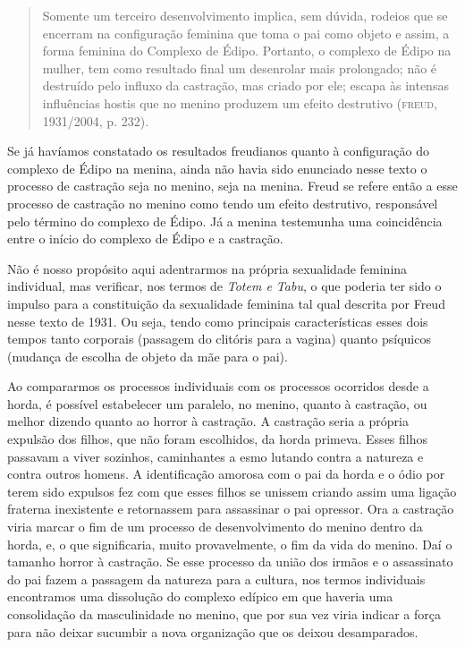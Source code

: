 \begin{quote}
Somente um terceiro desenvolvimento implica, sem dúvida, rodeios que se
encerram na configuração feminina que toma o pai como objeto e assim, a
forma feminina do Complexo de Édipo. Portanto, o complexo de Édipo na
mulher, tem como resultado final um desenrolar mais prolongado; não é
destruído pelo influxo da castração, mas criado por ele; escapa às
intensas influências hostis que no menino produzem um efeito destrutivo
(\textsc{freud}, 1931/2004, p. 232).
\end{quote}

Se já havíamos constatado os resultados freudianos quanto à configuração
do complexo de Édipo na menina, ainda não havia sido enunciado nesse
texto o processo de castração seja no menino, seja na menina. Freud se
refere então a esse processo de castração no menino como tendo um efeito
destrutivo, responsável pelo término do complexo de Édipo. Já a menina
testemunha uma coincidência entre o início do complexo de Édipo e a
castração.

Não é nosso propósito aqui adentrarmos na própria sexualidade feminina
individual, mas verificar, nos termos de \emph{Totem e Tabu}, o que poderia ter
sido o impulso para a constituição da sexualidade feminina tal qual
descrita por Freud nesse texto de 1931. Ou seja, tendo como principais
características esses dois tempos tanto corporais (passagem do clitóris
para a vagina) quanto psíquicos (mudança de escolha de objeto da mãe
para o pai).

Ao compararmos os processos individuais com os processos ocorridos desde
a horda, é possível estabelecer um paralelo, no menino, quanto à
castração, ou melhor dizendo quanto ao horror à castração. A castração
seria a própria expulsão dos filhos, que não foram escolhidos, da horda
primeva. Esses filhos passavam a viver sozinhos, caminhantes a esmo
lutando contra a natureza e contra outros homens. A identificação
amorosa com o pai da horda e o ódio por terem sido expulsos fez com que
esses filhos se unissem criando assim uma ligação fraterna inexistente e
retornassem para assassinar o pai opressor. Ora a castração viria marcar
o fim de um processo de desenvolvimento do menino dentro da horda, e, o
que significaria, muito provavelmente, o fim da vida do menino. Daí o
tamanho horror à castração. Se esse processo da união dos irmãos e o
assassinato do pai fazem a passagem da natureza para a cultura, nos
termos individuais encontramos uma dissolução do complexo edípico em
que haveria uma consolidação da masculinidade no menino, que por sua vez
viria indicar a força para não deixar sucumbir a nova organização que os
deixou desamparados.

